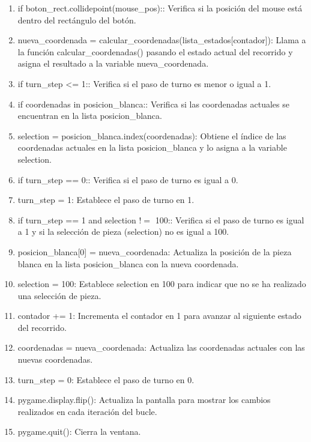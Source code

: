 \begin{enumerate}
\begin{enumerate}
\begin{enumerate}
        \item if boton\_rect.collidepoint(mouse\_pos):: Verifica si la posición del mouse está dentro del rectángulo del botón.\newline
        \item nueva\_coordenada = calcular\_coordenadas(lista\_estados[contador]): Llama a la función calcular\_coordenadas() pasando el estado actual del recorrido y asigna el resultado a la variable nueva\_coordenada.\newline
        \item if turn\_step <= 1:: Verifica si el paso de turno es menor o igual a 1.\newline
        \item if coordenadas in posicion\_blanca:: Verifica si las coordenadas actuales se encuentran en la lista posicion\_blanca.\newline
        \item selection = posicion\_blanca.index(coordenadas): Obtiene el índice de las coordenadas actuales en la lista posicion\_blanca y lo asigna a la variable selection.\newline
        \item if turn\_step == 0:: Verifica si el paso de turno es igual a 0.\newline
        \item turn\_step = 1: Establece el paso de turno en 1.\newline
        \item if turn\_step == 1 and selection $!=$ 100:: Verifica si el paso de turno es igual a 1 y si la selección de pieza (selection) no es igual a 100.\newline
        \item posicion\_blanca[0] = nueva\_coordenada: Actualiza la posición de la pieza blanca en la lista posicion\_blanca con la nueva coordenada.\newline
        \item selection = 100: Establece selection en 100 para indicar que no se ha realizado una selección de pieza.\newline
        \item contador += 1: Incrementa el contador en 1 para avanzar al siguiente estado del recorrido.\newline
        \item coordenadas = nueva\_coordenada: Actualiza las coordenadas actuales con las nuevas coordenadas.\newline
        \item turn\_step = 0: Establece el paso de turno en 0.\newline
        \item pygame.display.flip(): Actualiza la pantalla para mostrar los cambios realizados en cada iteración del bucle.\newline
        \item pygame.quit(): Cierra la ventana.\newline
    

\end{enumerate}
\end{enumerate}
\end{enumerate}
